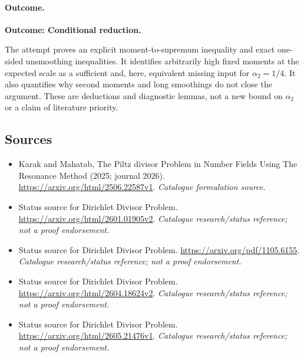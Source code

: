 \documentclass[11pt,a4paper]{article}
\numberwithin{equation}{section}
\begin{document}
\paragraph{Outcome.}
\textbf{Outcome: Conditional reduction.}

The attempt proves an explicit moment-to-supremum inequality and exact
one-sided unsmoothing inequalities. It identifies arbitrarily high fixed
moments at the expected scale as a sufficient and, here, equivalent missing
input for $\alpha_2=1/4$. It also quantifies why second moments and long
smoothings do not close the argument. These are deductions and diagnostic
lemmas, not a new bound on $\alpha_2$ or a claim of literature priority.
\subsection{Sources}
\begin{itemize}\raggedright
\item[\textnormal{[S1]}]\hypertarget{source:1278:1}{} Karak and Mahatab, The Piltz divisor Problem in Number Fields Using The Resonance Method (2025; journal 2026).
\url{https://arxiv.org/html/2506.22587v1}.
{\small\textit{Catalogue formulation source.}}
\item[\textnormal{[S2]}]\hypertarget{source:1278:2}{} Status source for Dirichlet Divisor Problem.
\url{https://arxiv.org/html/2601.01905v2}.
{\small\textit{Catalogue research/status reference; not a proof endorsement.}}
\item[\textnormal{[S3]}]\hypertarget{source:1278:3}{} Status source for Dirichlet Divisor Problem.
\url{https://arxiv.org/pdf/1105.6155}.
{\small\textit{Catalogue research/status reference; not a proof endorsement.}}
\item[\textnormal{[S4]}]\hypertarget{source:1278:4}{} Status source for Dirichlet Divisor Problem.
\url{https://arxiv.org/html/2604.18624v2}.
{\small\textit{Catalogue research/status reference; not a proof endorsement.}}
\item[\textnormal{[S5]}]\hypertarget{source:1278:5}{} Status source for Dirichlet Divisor Problem.
\url{https://arxiv.org/html/2605.21476v1}.
{\small\textit{Catalogue research/status reference; not a proof endorsement.}}
\end{itemize}
\end{document}
